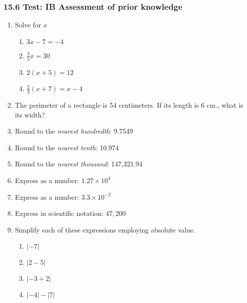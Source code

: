 

\fancyhead[LE]{\thepage}



\subsubsection*{15.6 Test: IB Assessment of prior knowledge}

\begin{enumerate}[itemsep=0.75cm]
  \item Solve for $x$
  \begin{multicols}{2}
    \begin{enumerate}[itemsep=3cm]
      \item $3x-7=-4$
      \item $\frac{3}{5}x =30$
      \item $2(x+5)=12$
      \item $\frac{2}{3}(x+7)=x-4$
    \end{enumerate}
  \end{multicols} \vspace{3cm}

  \item The perimeter of a rectangle is 54 centimeters. If its length is 6 cm., what is its width? \vspace{3cm}
  
  \item Round to the \emph{nearest hundredth}: 9.7549
  \item Round to the \emph{nearest tenth}: 10.974
  \item Round to the \emph{nearest thousand}: 147,321.94

  \item Express as a number: $1.27 \times 10^4$
  \item Express as a number: $3.3 \times 10^{-2}$
  \item Express in scientific notation: $47,200$
  
  \newpage
  \item Simplify each of these expressions employing absolute value.
  \begin{multicols}{2}
    \begin{enumerate}[itemsep=1.7cm]
      \item $|-7|$
      \item $|2-5|$
      \item $|-3+2|$
      \item $|-4|-|7|$
    \end{enumerate}
  \end{multicols}


\end{enumerate}
